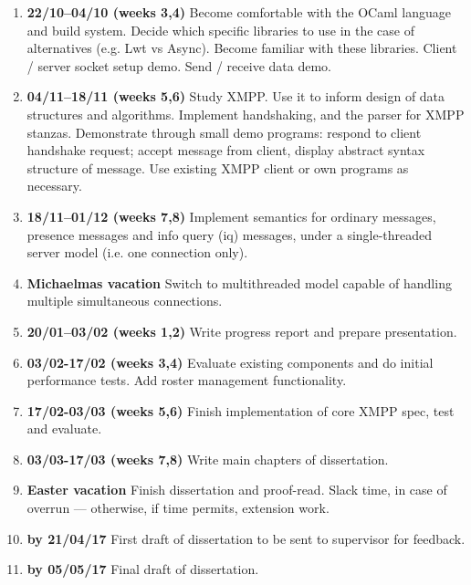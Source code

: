 \documentclass[12pt,a4paper,twoside]{article}
\begin{document}
\begin{enumerate}

\item \textbf{22/10--04/10 (weeks 3,4)} Become comfortable with the OCaml language and build system.
  Decide which specific libraries to use in the case of alternatives (e.g. Lwt vs Async). Become familiar
  with these libraries. Client / server socket setup demo. Send / receive data demo.

\item \textbf{04/11--18/11 (weeks 5,6)} Study XMPP. Use it to inform design of data structures and algorithms.
  Implement handshaking, and the parser for XMPP stanzas. Demonstrate through small demo programs: respond
  to client handshake request; accept message from client, display abstract syntax structure of message. Use
  existing XMPP client or own programs as necessary.

\item \textbf{18/11--01/12 (weeks 7,8)} Implement semantics for ordinary messages, presence messages and
  info query (iq) messages, under a single-threaded server model (i.e. one connection only).

\item \textbf{Michaelmas vacation} Switch to multithreaded model capable of handling multiple simultaneous connections.

\item \textbf{20/01--03/02 (weeks 1,2)} Write progress report and prepare presentation.

\item \textbf{03/02-17/02 (weeks 3,4)} Evaluate existing components and do initial performance tests.
  Add roster management functionality.

\item \textbf{17/02-03/03 (weeks 5,6)} Finish implementation of core XMPP spec, test and evaluate.

\item \textbf{03/03-17/03 (weeks 7,8)} Write main chapters of dissertation.

\item \textbf{Easter vacation} Finish dissertation and proof-read. Slack time, in case of overrun --- otherwise, if time permits, extension work.

\item \textbf{by 21/04/17} First draft of dissertation to be sent to supervisor for feedback.

\item \textbf{by 05/05/17} Final draft of dissertation.

\end{enumerate}
\end{document}
